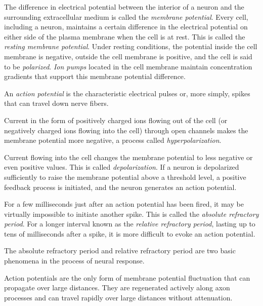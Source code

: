 The difference in electrical potential between the interior of a neuron and the surrounding extracellular medium is called the \emph{membrane potential}.
Every cell, including a neuron, maintains a certain difference in the electrical potential on either side of the plasma membrane when the cell is at rest. This is called the \emph{resting membrane potential}.
\rem Under resting conditions, the potential inside the cell membrane is negative, outside the cell membrane is positive, and the cell is said to be \emph{polarized}. \emph{Ion pumps} located in the cell membrane maintain concentration gradients that support this membrane potential difference.

An \emph{action potential} is the characteristic electrical pulses or, more simply, spikes that can travel down nerve fibers.

Current in the form of positively charged ions flowing out of the cell (or negatively charged ions flowing into the cell) through open channels makes the membrane potential more negative, a process called \emph{hyperpolarization}.

Current flowing into the cell changes the membrane potential to less negative or even positive values. This is called \emph{depolarization}.
\rem If a neuron is depolarized sufficiently to raise the membrane potential above a threshold level, a positive feedback process is initiated, and the neuron generates an action potential.

For a few milliseconds just after an action potential has been fired, it may be virtually impossible to initiate another spike. This is called the \emph{absolute refractory period}. For a longer interval known as the \emph{relative refractory period}, lasting up to tens of milliseconds after a spike, it is more difficult to evoke an action potential.

\rem The absolute refractory period and relative refractory period are two basic phenomena in the process of neural response.

\rem Action potentials are the only form of membrane potential fluctuation that can propagate over large distances. They are regenerated actively along axon processes and can travel rapidly over large distances without attenuation.
